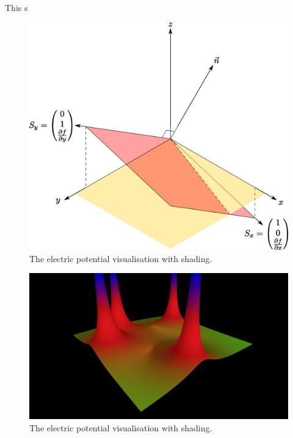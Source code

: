 \documentclass{article} %
\begin{document}
This s

\begin{figure}
\label{fig:shading}
\includegraphics[width=\linewidth]{diagram.eps}
\caption{The electric potential visualisation with shading.}
\end{figure}


\begin{figure}
\label{fig:shading}
\includegraphics[width=\linewidth]{shading.png}
\caption{The electric potential visualisation with shading.}
\end{figure}
\end{document}
